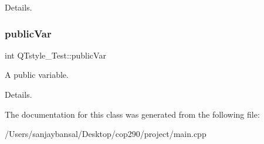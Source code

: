 Details. \mbox{\label{class_q_tstyle___test_aabf7b2e9ed83ea44aca4d213baae06d3}} 
\subsubsection{\texorpdfstring{public\+Var}{publicVar}}
{\footnotesize\ttfamily int Q\+Tstyle\+\_\+\+Test\+::public\+Var}



A public variable. 

Details. 

The documentation for this class was generated from the following file\+:\begin{DoxyCompactItemize}
\item 
/\+Users/sanjaybansal/\+Desktop/cop290/project/main.\+cpp\end{DoxyCompactItemize}
